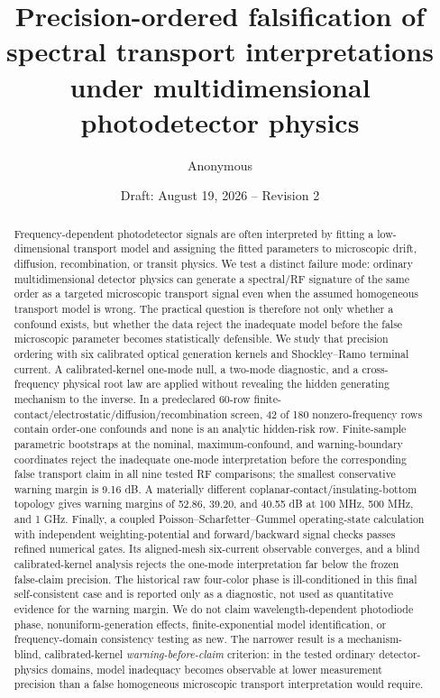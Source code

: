 \documentclass[11pt]{article}
\title{Precision-ordered falsification of spectral transport interpretations under multidimensional photodetector physics}
\author{Anonymous}
\date{Draft: August 19, 2026 -- Revision 2}
\begin{document}
\maketitle

\begin{abstract}
Frequency-dependent photodetector signals are often interpreted by fitting a low-dimensional transport model and assigning the fitted parameters to microscopic drift, diffusion, recombination, or transit physics. We test a distinct failure mode: ordinary multidimensional detector physics can generate a spectral/RF signature of the same order as a targeted microscopic transport signal even when the assumed homogeneous transport model is wrong. The practical question is therefore not only whether a confound exists, but whether the data reject the inadequate model before the false microscopic parameter becomes statistically defensible. We study that precision ordering with six calibrated optical generation kernels and Shockley--Ramo terminal current. A calibrated-kernel one-mode null, a two-mode diagnostic, and a cross-frequency physical root law are applied without revealing the hidden generating mechanism to the inverse. In a predeclared 60-row finite-contact/electrostatic/diffusion/recombination screen, 42 of 180 nonzero-frequency rows contain order-one confounds and none is an analytic hidden-risk row. Finite-sample parametric bootstraps at the nominal, maximum-confound, and warning-boundary coordinates reject the inadequate one-mode interpretation before the corresponding false transport claim in all nine tested RF comparisons; the smallest conservative warning margin is 9.16 dB. A materially different coplanar-contact/insulating-bottom topology gives warning margins of 52.86, 39.20, and 40.55 dB at 100 MHz, 500 MHz, and 1 GHz. Finally, a coupled Poisson--Scharfetter--Gummel operating-state calculation with independent weighting-potential and forward/backward signal checks passes refined numerical gates. Its aligned-mesh six-current observable converges, and a blind calibrated-kernel analysis rejects the one-mode interpretation far below the frozen false-claim precision. The historical raw four-color phase is ill-conditioned in this final self-consistent case and is reported only as a diagnostic, not used as quantitative evidence for the warning margin. We do not claim wavelength-dependent photodiode phase, nonuniform-generation effects, finite-exponential model identification, or frequency-domain consistency testing as new. The narrower result is a mechanism-blind, calibrated-kernel \emph{warning-before-claim} criterion: in the tested ordinary detector-physics domains, model inadequacy becomes observable at lower measurement precision than a false homogeneous microscopic transport interpretation would require.
\end{abstract}
\end{document}

